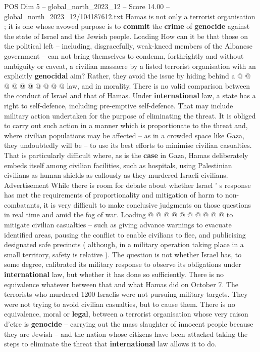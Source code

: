 \begin{textsample}{POS Dim 5 – global\_north\_2023\_12 – Score 14.00 – global\_north\_2023\_12/104187612.txt}
Hamas is not only a terrorist organisation ; it is one whose avowed purpose is to \textbf{commit} the \textbf{crime} of \textbf{genocide} against the state of Israel and the Jewish people.
Loading How can it be that those on the political left -- including, disgracefully, weak-kneed members of the Albanese government -- can not bring themselves to condemn, forthrightly and without ambiguity or caveat, a civilian massacre by a listed terrorist organisation with an explicitly \textbf{genocidal} aim?
Rather, they avoid the issue by hiding behind a @ @ @ @ @ @ @ @ @ @ law, and in morality.
There is no valid comparison between the conduct of Israel and that of Hamas.
Under \textbf{international} law, a state has a right to self-defence, including pre-emptive self-defence.
That may include military action undertaken for the purpose of eliminating the threat.
It is obliged to carry out such action in a manner which is proportionate to the threat and, where civilian populations may be affected -- as in a crowded space like Gaza, they undoubtedly will be -- to use its best efforts to minimise civilian casualties.
That is particularly difficult where, as is the \textbf{case} in Gaza, Hamas deliberately embeds itself among civilian facilities, such as hospitals, using Palestinian civilians as human shields as callously as they murdered Israeli civilians.
Advertisement While there is room for debate about whether Israel ' s response has met the requirements of proportionality and mitigation of harm to non-combatants, it is very difficult to make conclusive judgments on those questions in real time and amid the fog of war.
Loading @ @ @ @ @ @ @ @ @ @ to mitigate civilian casualties -- such as giving advance warnings to evacuate identified areas, pausing the conflict to enable civilians to flee, and publicising designated safe precincts ( although, in a military operation taking place in a small territory, safety is relative ).
The question is not whether Israel has, to some degree, calibrated its military response to observe its obligations under \textbf{international} law, but whether it has done so sufficiently.
There is no equivalence whatever between that and what Hamas did on October 7.
The terrorists who murdered 1200 Israelis were not pursuing military targets.
They were not trying to avoid civilian casualties, but to cause them.
There is no equivalence, moral or \textbf{legal}, between a terrorist organisation whose very raison d'etre is \textbf{genocide} -- carrying out the mass slaughter of innocent people because they are Jewish -- and the nation whose citizens have been attacked taking the steps to eliminate the threat that \textbf{international} law allows it to do.

\end{textsample}
